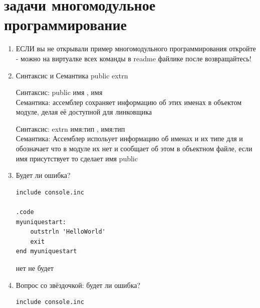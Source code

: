 \documentclass[a4paper,10pt]{article}
\begin{document}
\section*{задачи многомодульное программирование}
\begin{enumerate}
    
    \item ЕСЛИ вы не открывали пример многомодульного программирования откройте - можно на виртуалке всех команды в readme файлике после возвращайтесь!
    \item Синтаксис и Семантика public extrn\par
Синтаксис: public имя {, имя} \\
Семантика: ассемблер сохраняет информацию об этих именах в объектом модуле, делая её доступной для линковщика \par
Синтаксис: extrn имя:тип {, имя:тип} \\
Семантика: Ассемблер испольует информацию об именах и их типе для и обозначает что в модуле их нет и сообщает об этом в объектном файле, если имя присутствует то сделает имя public \par
    \item Будет ли ошибка?
\begin{verbatim}
include console.inc

.code
myuniquestart: 
    outstrln 'HelloWorld'
    exit
end myuniquestart
\end{verbatim}\par нет не будет
    \item Вопрос со звёздочкой: будет ли ошибка?
\begin{verbatim}
include console.inc


\end{verbatim}
\end{enumerate}
\end{document}
